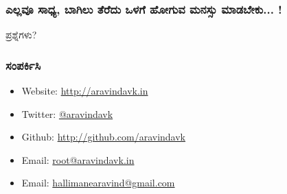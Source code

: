 \documentclass[16pt]{beamer}
\newcommand\en[1]{{\english #1}}
\begin{document}
\begin{spacing}{1.6}
  \begin{frame}
    \frametitle{ಎಲ್ಲವೂ ಸಾಧ್ಯ, ಬಾಗಿಲು ತೆರೆದು ಒಳಗೆ ಹೋಗುವ ಮನಸ್ಸು ಮಾಡಬೇಕು... !}
    \LARGE
    ಪ್ರಶ್ನೆಗಳು? \\
  \end{frame}

  \begin{frame}
    \frametitle{ಸಂಪರ್ಕಿಸಿ}
    \normalsize
    \begin{itemize}
    \item \en{Website: } \url{http://aravindavk.in}
    \item \en{Twitter: } \href{http://twitter.com/aravindavk}{\en{@aravindavk}}
    \item \en{Github: } \url{http://github.com/aravindavk}
    \item \en{Email: }\href{mailto:root@aravindavk.in}{\en{root@aravindavk.in}}
    \item \en{Email: }\href{mailto:hallimanearavind@gmail.com}{\en{hallimanearavind@gmail.com}}
    \end{itemize}

  \end{frame}

\end{spacing}
\end{document}

